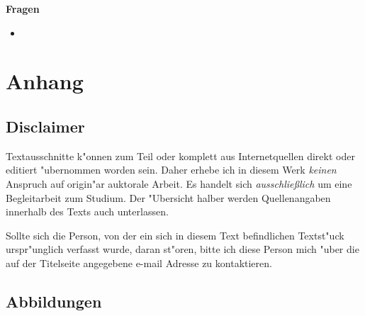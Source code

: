 \documentclass[]{scrartcl}
\begin{document}
\textbf{Fragen}

\begin{itemize}
  \item 
\end{itemize}



\newpage
\section{Anhang}

\subsection{Disclaimer}

Textausschnitte k"onnen zum Teil oder komplett aus Internetquellen direkt oder editiert "ubernommen worden sein. Daher erhebe ich in diesem Werk \emph{keinen} Anspruch auf origin"ar auktorale Arbeit. Es handelt sich \emph{ausschlie\ss lich} um eine Begleitarbeit zum Studium. Der "Ubersicht halber werden Quellenangaben innerhalb des Texts auch unterlassen. 

Sollte sich die Person, von der ein sich in diesem Text befindlichen Textst"uck urspr"unglich verfasst wurde, daran st"oren, bitte ich diese Person mich "uber die auf der Titelseite angegebene e-mail Adresse zu kontaktieren.
\subsection{Abbildungen}
\end{document}
